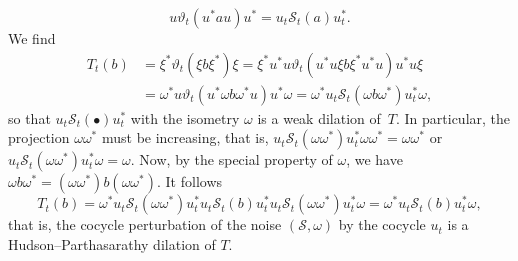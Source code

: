 \documentclass[11pt]{article}
\numberwithin{equation}{section}
\newcommand{\eus}[1]{\mathscr{#1}}
\newcommand{\vt}{\vartheta}
\newcommand{\om}{\omega}
\newcommand{\sS}{\eus{S}}
\numberwithin{equation}{section}
\begin{document}
\[
u\vt_t(u^*au)u^*=u_t\sS_t(a)u_t^*.
\]
We find
\begin{align*}
T_t(b) & = \xi^*\vt_t(\xi b\xi^*)\xi=\xi^*u^*u\vt_t(u^*u\xi b\xi^*u^*u)u^*u\xi\\
& = \om^*u\vt_t(u^*\om b\om^*u)u^*\om=\om^*u_t\sS_t(\om b\om^*)u_t^*\om,
\end{align*}
so that $u_t\sS_t(\bullet)u_t^*$ with the isometry $\om$ is a weak dilation of~$T$. In particular, the projection $\om\om^*$ must be increasing, that is, $u_t\sS_t(\om\om^*)u_t^*\om\om^*=\om\om^*$ or $u_t\sS_t(\om\om^*)u_t^*\om=\om$. Now, by the special property of $\om$, we have $\om b\om^*=(\om\om^*)b(\om\om^*)$. It follows
\[
T_t(b)
=\om^*u_t\sS_t(\om \om^*)u_t^*u_t\sS_t(b)u_t^*u_t\sS_t(\om \om^*)u_t^*\om
=\om^*u_t\sS_t(b)u_t^*\om,
\]
that is, the cocycle perturbation of the noise $(\sS,\om)$ by the cocycle $u_t$ is a Hudson--Parthasarathy dilation of $T$.
\end{document}
